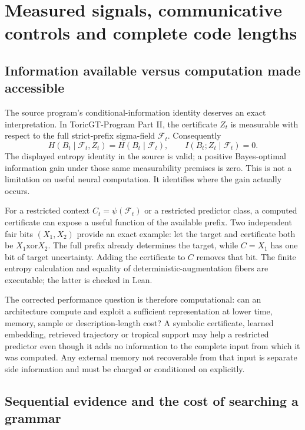 \chapter{Measured signals, communicative controls and complete code lengths}
\label{ch:new-physical-controls}

\section{Information available versus computation made accessible}

The source program's conditional-information identity deserves an exact interpretation. In ToricGT-Program Part II, the certificate $Z_t$ is measurable with respect to the full strict-prefix sigma-field $\mathcal F_t$. Consequently
\[
 H(B_t\mid\mathcal F_t,Z_t)=H(B_t\mid\mathcal F_t),\qquad
 I(B_t;Z_t\mid\mathcal F_t)=0.
\]
The displayed entropy identity in the source is valid; a positive Bayes-optimal information gain under those same measurability premises is zero. This is not a limitation on useful neural computation. It identifies where the gain actually occurs.

For a restricted context $C_t=\psi(\mathcal F_t)$ or a restricted predictor class, a computed certificate can expose a useful function of the available prefix. Two independent fair bits $(X_1,X_2)$ provide an exact example: let the target and certificate both be $X_1\mathbin{\mathrm{xor}}X_2$. The full prefix already determines the target, while $C=X_1$ has one bit of target uncertainty. Adding the certificate to $C$ removes that bit. The finite entropy calculation and equality of deterministic-augmentation fibers are executable; the latter is checked in Lean.

The corrected performance question is therefore computational: can an architecture compute and exploit a sufficient representation at lower time, memory, sample or description-length cost? A symbolic certificate, learned embedding, retrieved trajectory or tropical support may help a restricted predictor even though it adds no information to the complete input from which it was computed. Any external memory not recoverable from that input is separate side information and must be charged or conditioned on explicitly.

\section{Sequential evidence and the cost of searching a grammar}

